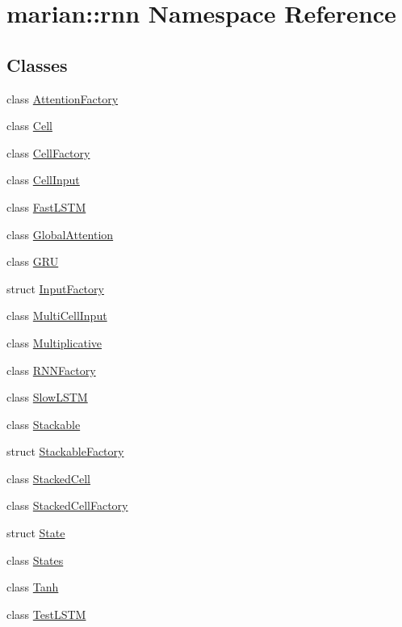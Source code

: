 \hypertarget{namespacemarian_1_1rnn}{}\section{marian\+:\+:rnn Namespace Reference}
\label{namespacemarian_1_1rnn}
\subsection*{Classes}
\begin{DoxyCompactItemize}
\item 
class \hyperlink{classmarian_1_1rnn_1_1AttentionFactory}{Attention\+Factory}
\item 
class \hyperlink{classmarian_1_1rnn_1_1Cell}{Cell}
\item 
class \hyperlink{classmarian_1_1rnn_1_1CellFactory}{Cell\+Factory}
\item 
class \hyperlink{classmarian_1_1rnn_1_1CellInput}{Cell\+Input}
\item 
class \hyperlink{classmarian_1_1rnn_1_1FastLSTM}{Fast\+L\+S\+TM}
\item 
class \hyperlink{classmarian_1_1rnn_1_1GlobalAttention}{Global\+Attention}
\item 
class \hyperlink{classmarian_1_1rnn_1_1GRU}{G\+RU}
\item 
struct \hyperlink{structmarian_1_1rnn_1_1InputFactory}{Input\+Factory}
\item 
class \hyperlink{classmarian_1_1rnn_1_1MultiCellInput}{Multi\+Cell\+Input}
\item 
class \hyperlink{classmarian_1_1rnn_1_1Multiplicative}{Multiplicative}
\item 
class \hyperlink{classmarian_1_1rnn_1_1RNNFactory}{R\+N\+N\+Factory}
\item 
class \hyperlink{classmarian_1_1rnn_1_1SlowLSTM}{Slow\+L\+S\+TM}
\item 
class \hyperlink{classmarian_1_1rnn_1_1Stackable}{Stackable}
\item 
struct \hyperlink{structmarian_1_1rnn_1_1StackableFactory}{Stackable\+Factory}
\item 
class \hyperlink{classmarian_1_1rnn_1_1StackedCell}{Stacked\+Cell}
\item 
class \hyperlink{classmarian_1_1rnn_1_1StackedCellFactory}{Stacked\+Cell\+Factory}
\item 
struct \hyperlink{structmarian_1_1rnn_1_1State}{State}
\item 
class \hyperlink{classmarian_1_1rnn_1_1States}{States}
\item 
class \hyperlink{classmarian_1_1rnn_1_1Tanh}{Tanh}
\item 
class \hyperlink{classmarian_1_1rnn_1_1TestLSTM}{Test\+L\+S\+TM}
\end{DoxyCompactItemize}
